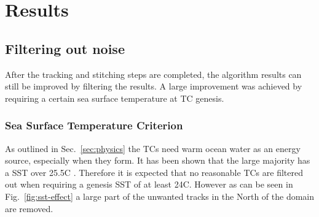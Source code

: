 \chapter{Results}\label{sec:results}

\section{Filtering out noise}\label{sec:noise}
After the tracking and stitching steps are completed, the algorithm results can
still be improved by filtering the results. A large improvement was
achieved by requiring a certain sea surface temperature at TC genesis.
\subsection*{Sea Surface Temperature Criterion}
As outlined in Sec.~\ref{sec:physics} the TCs need warm ocean water as an
energy source, especially when they form. It has been shown that the large
majority has a SST over 25.5\degree C \cite{sst-paper}. Therefore it is
expected that no reasonable TCs are filtered out when requiring a genesis SST
of at least 24\degree C. However as can be seen in Fig.~\ref{fig:sst-effect}
a large part of the unwanted tracks in the North of the domain are removed.
